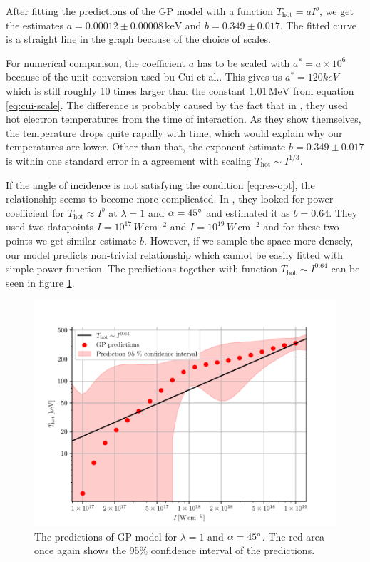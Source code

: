 After fitting the predictions of the GP model with a function $T_{\mathrm{hot}}= aI^b$, we get the estimates $a=0.00012\pm0.00008 \, \mathrm{keV}$ and $b=0.349\pm0.017$. The fitted curve is a straight line in the graph because of the choice of scales.

For numerical comparison, the coefficient $a$ has to be scaled with $a^* = a\times 10^6$ because of the unit conversion used bu Cui et al.. This gives us $a^* = 120 keV$ which is still roughly 10 times larger than the constant $1.01\, \mathrm{MeV}$ from equation \ref{eq:cui-scale}. The difference is probably caused by the fact that in \cite{cui2013}, they used hot electron temperatures from the time of interaction. As they show themselves, the temperature drops quite rapidly with time, which would explain why our temperatures are lower.
Other than that, the exponent estimate  $b=0.349\pm0.017$ is within one standard error in a agreement with scaling $T_\mathrm{hot} \sim I^{1/3}$.	

If the angle of incidence is not satisfying the condition \ref{eq:res-opt}, the relationship seems to become more complicated. In \cite{cui2013}, they looked for power coefficient for $T_\mathrm{hot} \approx I^{b}$ at $\lambda = 1$ and $\alpha = 45\degree$ and estimated it as $b=0.64$. They used two datapoints $I = 10^{17} \, W \, \mathrm{cm}^{-2}$ and $I = 10^{19} \, W \, \mathrm{cm}^{-2}$ and for these two points we get similar estimate $b$. However, if we sample the space more densely, our model predicts non-trivial relationship which cannot be easily fitted with simple power function. The predictions  together with function $T_\mathrm{hot} \sim I^{0.64}$ can be seen in figure \ref{fig:cui-compare-2}.

\begin{figure}[h]
	\centering
	\includegraphics[width=0.95 \textwidth]{figures/cui_compare2}
	\caption{The predictions of GP model for $\lambda = 1$ and $\alpha = 45\degree$. The red area once again shows the 95\% confidence interval of the predictions.}
	\label{fig:cui-compare-2}
\end{figure}


